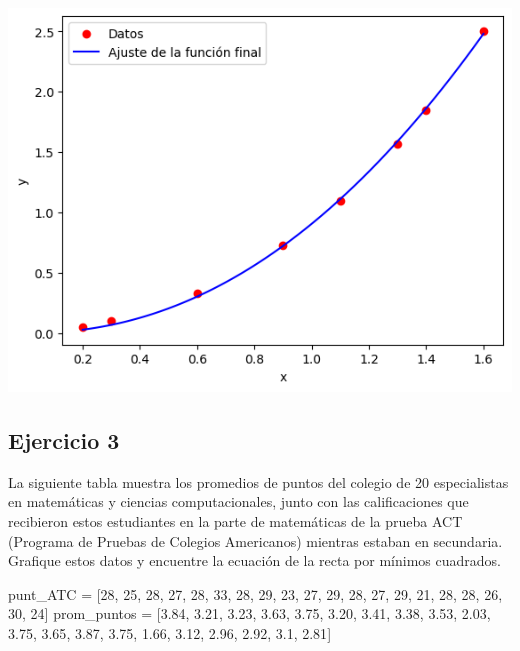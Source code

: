\documentclass[
  letterpaper,
  DIV=11,
  numbers=noendperiod]{scrartcl}
\newenvironment{Shaded}{\begin{snugshade}}{\end{snugshade}}
\newcommand{\DecValTok}[1]{\textcolor[rgb]{0.68,0.00,0.00}{#1}}
\newcommand{\FloatTok}[1]{\textcolor[rgb]{0.68,0.00,0.00}{#1}}
\newcommand{\NormalTok}[1]{\textcolor[rgb]{0.00,0.23,0.31}{#1}}
\newcommand{\OperatorTok}[1]{\textcolor[rgb]{0.37,0.37,0.37}{#1}}
\begin{document}
\includegraphics{Tarea8_MN_files/figure-pdf/cell-14-output-2.png}

\subsection{Ejercicio 3}\label{ejercicio-3}

La siguiente tabla muestra los promedios de puntos del colegio de 20
especialistas en matemáticas y ciencias computacionales, junto con las
calificaciones que recibieron estos estudiantes en la parte de
matemáticas de la prueba ACT (Programa de Pruebas de Colegios
Americanos) mientras estaban en secundaria. Grafique estos datos y
encuentre la ecuación de la recta por mínimos cuadrados.

\begin{Shaded}
\begin{Highlighting}[]

\NormalTok{punt\_ATC }\OperatorTok{=}\NormalTok{ [}\DecValTok{28}\NormalTok{, }\DecValTok{25}\NormalTok{, }\DecValTok{28}\NormalTok{, }\DecValTok{27}\NormalTok{, }\DecValTok{28}\NormalTok{, }\DecValTok{33}\NormalTok{, }\DecValTok{28}\NormalTok{, }\DecValTok{29}\NormalTok{, }\DecValTok{23}\NormalTok{, }\DecValTok{27}\NormalTok{,}
            \DecValTok{29}\NormalTok{, }\DecValTok{28}\NormalTok{, }\DecValTok{27}\NormalTok{, }\DecValTok{29}\NormalTok{, }\DecValTok{21}\NormalTok{, }\DecValTok{28}\NormalTok{, }\DecValTok{28}\NormalTok{, }\DecValTok{26}\NormalTok{, }\DecValTok{30}\NormalTok{, }\DecValTok{24}\NormalTok{]}
\NormalTok{prom\_puntos }\OperatorTok{=}\NormalTok{ [}\FloatTok{3.84}\NormalTok{, }\FloatTok{3.21}\NormalTok{, }\FloatTok{3.23}\NormalTok{, }\FloatTok{3.63}\NormalTok{, }\FloatTok{3.75}\NormalTok{, }\FloatTok{3.20}\NormalTok{, }\FloatTok{3.41}\NormalTok{, }\FloatTok{3.38}\NormalTok{, }\FloatTok{3.53}\NormalTok{, }\FloatTok{2.03}\NormalTok{, }
               \FloatTok{3.75}\NormalTok{, }\FloatTok{3.65}\NormalTok{, }\FloatTok{3.87}\NormalTok{, }\FloatTok{3.75}\NormalTok{, }\FloatTok{1.66}\NormalTok{, }\FloatTok{3.12}\NormalTok{, }\FloatTok{2.96}\NormalTok{, }\FloatTok{2.92}\NormalTok{, }\FloatTok{3.1}\NormalTok{, }\FloatTok{2.81}\NormalTok{]}
\end{Highlighting}
\end{Shaded}
\end{document}
